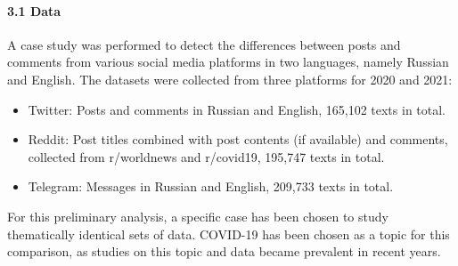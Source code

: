 \paragraph{3.1 Data} A case study was performed to detect the differences between posts and comments from various social media platforms in two languages, namely Russian and English. The datasets were collected from three platforms for 2020 and 2021:

\begin{itemize}
	\item Twitter: Posts and comments in Russian and English, 165,102 texts in total.
	\item Reddit: Post titles combined with post contents (if available) and comments, collected from r/worldnews and r/covid19, 195,747 texts in total.
	\item Telegram: Messages in Russian and English, 209,733 texts in total.
\end{itemize}

For this preliminary analysis, a specific case has been chosen to study thematically identical sets of data. COVID-19 has been chosen as a topic for this comparison, as studies on this topic and data became prevalent in recent years.

